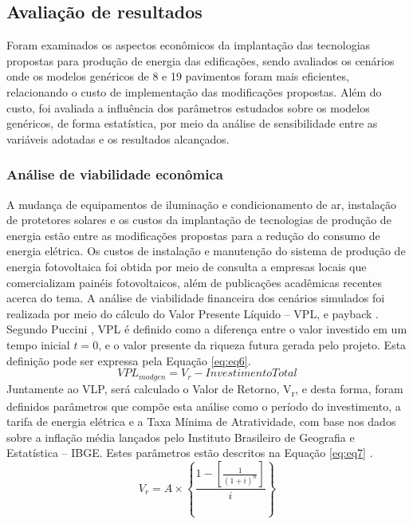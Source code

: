 \subsection{Avaliação de resultados}
\noindent Foram examinados os aspectos econômicos da implantação das tecnologias propostas para produção de energia das edificações, sendo avaliados os cenários onde os modelos genéricos de 8 e 19 pavimentos foram mais eficientes, relacionando o custo de implementação das modificações propostas. Além do custo, foi avaliada a influência dos parâmetros estudados sobre os modelos genéricos, de forma estatística, por meio da análise de sensibilidade entre as variáveis adotadas e os resultados alcançados.
\subsubsection{Análise de viabilidade econômica}
\noindent A mudança de equipamentos de iluminação e condicionamento de ar, instalação de protetores solares  e  os  custos  da  implantação  de  tecnologias  de  produção  de  energia  estão  entre  as modificações propostas para a redução do consumo de energia elétrica. Os custos de instalação e manutenção do sistema de produção de energia fotovoltaica foi obtida por meio de consulta a empresas  locais  que  comercializam  painéis  fotovoltaicos,  além  de  publicações  acadêmicas recentes acerca do tema.\newline
\noindent A análise de viabilidade financeira dos cenários simulados foi realizada por meio do cálculo do Valor Presente Líquido – VPL, e payback \cite{CasarottoFilho2010,Puccini2011}.  Segundo Puccini \citeyear{Puccini2011}, VPL é definido como a diferença entre o valor investido em um tempo inicial \(t=0\), e o valor presente da riqueza  futura  gerada  pelo  projeto.  Esta  definição  pode  ser  expressa pela Equação \ref{eq:eq6}.
\begin{equation}\label{eq:eq6}
    VPL_{mod gen}=V_r - Investimento Total
\end{equation}
\noindent Juntamente  ao  VLP,  será  calculado  o  Valor  de  Retorno, V\textsubscript{r},  e  desta  forma,  foram  definidos parâmetros que compõe esta análise como o período do investimento, a tarifa de energia elétrica e  a  Taxa  Mínima  de  Atratividade,  com  base  nos  dados  sobre  a  inflação  média  lançados  pelo Instituto Brasileiro de Geografia e Estatística – IBGE. Estes parâmetros estão descritos na Equação \ref{eq:eq7} \cite{Puccini2011}.\newline
\begin{equation}\label{eq:eq7}
    V_r=A \times \left\{\frac{1-\left[\frac{1}{(1+i)^n}\right]}{i}\right\}
\end{equation}
